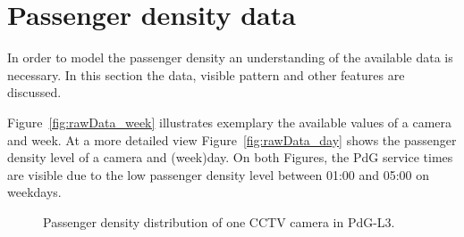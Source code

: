 \section{Passenger density data}
\label{sec:PassengerDensityData}

In order to model the passenger density an understanding of the available data is necessary. In this section the data, visible pattern and other features are discussed.

Figure~\ref{fig:rawData_week} illustrates exemplary the available values of a camera and week. At a more detailed view Figure~\ref{fig:rawData_day} shows the passenger density level of a camera and (week)day. On both Figures, the PdG service times are visible due to the low passenger density level between 01:00 and 05:00 on weekdays.

\begin{figure}[htbp]

  \centering

  \hfill

  \caption{Passenger density distribution of one CCTV camera in PdG-L3.}
  \label{fig:rawData}

\end{figure}